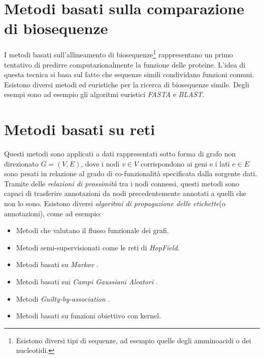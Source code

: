 \documentclass[12pt]{report}
\begin{document}
\section{Metodi basati sulla comparazione di biosequenze}
I metodi basati sull'allineamento di biosequenze\footnote{\footnotesize{Esistono diversi tipi di sequenze, ad esempio quelle degli amminoacidi o dei nucleotidi.}} rappresentano un primo tentativo di predirre computazionalmente la funzione delle proteine. L'idea di questa tecnica si basa sul fatto che sequenze simili condividano funzioni comuni.
\newline
\newline
Esistono diversi metodi ed euristiche per la ricerca di biosequenze simile. Degli esempi sono ad esempio gli algoritmi euristici \emph{FASTA}\cite{Fasta} e \emph{BLAST}\cite{Blast}.  
\section{Metodi basati su reti}

Questi metodi sono applicati a dati rappresentati sotto forma di grafo non direzionato $G = (V, E)$, dove i nodi $v \in V$ corrispondono ai geni e i lati $e \in E$ sono pesati in relazione al grado di co-funzionalità specificata dalla sorgente dati.
\newline
\newline
Tramite delle \emph{relazioni di prossimità} tra i nodi connessi, questi metodi sono capaci di trasferire annotazioni da nodi precedentemente annotati a quelli che non lo sono. 
\newline
\newline
Esistono diversi \emph{algoritmi di propagazione delle etichette}(o annotazioni), come ad esempio:
\begin{itemize}
\item Metodi che valutano il flusso funzionale dei grafi. \cite{flow}
\item Metodi semi-supervisionati come le reti di \emph{HopField}\cite{hopfield}.
\item Metodi basati su \emph{Markov} \cite{markov}.
\item Metodi basati sui \emph{Campi Gaussiani Aleatori} \cite{campigauss}.
\item Metodi \emph{Guilty-by-association} \cite{guilty}.
\item Metodi basati su funzioni obiettivo con kernel. \cite{kernelVal}
\end{itemize} 
\end{document}
